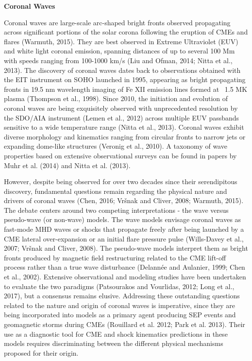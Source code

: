 \textbf{Coronal Waves}

Coronal waves are large-scale arc-shaped bright fronts observed propagating across significant portions of the solar corona following the eruption of CMEs and flares (Warmuth, 2015). They are best observed in Extreme Ultraviolet (EUV) and white light coronal emission, spanning distances of up to several 100 Mm with speeds ranging from 100-1000 km/s (Liu and Ofman, 2014; Nitta et al., 2013). The discovery of coronal waves dates back to observations obtained with the EIT instrument on SOHO launched in 1995, appearing as bright propagating fronts in 19.5 nm wavelength imaging of Fe XII emission lines formed at ~1.5 MK plasma (Thompson et al., 1998). Since 2010, the initiation and evolution of coronal waves are being exquisitely observed with unprecedented resolution by the SDO/AIA instrument (Lemen et al., 2012) across multiple EUV passbands sensitive to a wide temperature range (Nitta et al., 2013). Coronal waves exhibit diverse morphology and kinematics ranging from circular fronts to narrow jets or expanding dome-like structures (Veronig et al., 2010). A taxonomy of wave properties based on extensive observational surveys can be found in papers by Muhr et al. (2014) and Nitta et al. (2013).

However, despite being observed for over two decades since their serendipitous discovery, fundamental questions remain regarding the physical nature and drivers of coronal waves (Chen, 2016; Vršnak and Cliver, 2008; Warmuth, 2015). The debate centers around two competing interpretations - the wave versus pseudo-wave (or non-wave) models. The wave models envisage coronal waves as fast-mode MHD waves or shocks that propagate freely after being launched by a CME lateral over-expansion or an initial flare pressure pulse (Wills-Davey et al., 2007; Vršnak and Cliver, 2008). The pseudo-wave models interpret them as bright fronts produced by magnetic field restructuring related to the CME lift-off process rather than a true wave disturbance (Delannée and Aulanier, 1999; Chen et al., 2002). Extensive observational and modeling studies have been undertaken to evaluate the two paradigms (Patsourakos and Vourlidas, 2012; Long et al., 2017), but a consensus remains elusive. Addressing these outstanding questions related to the nature and origin of coronal waves is imperative, since they are being incorporated into models as a primary agent producing SEP events and geomagnetic storms during CMEs (Rouillard et al. 2012; Park et al. 2013). Their use as a diagnostic tool for CME and shock kinematics predictions in these models requires discriminating between the different physical mechanisms proposed for their origin.


